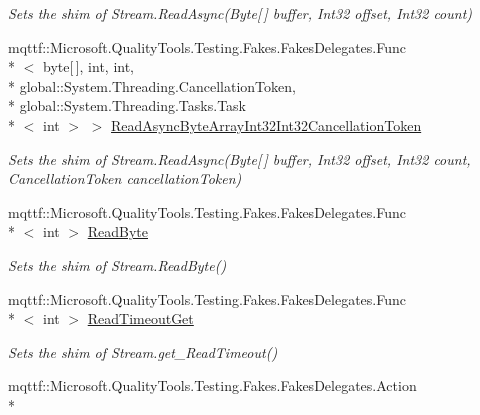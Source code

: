 \begin{DoxyCompactItemize}
\begin{DoxyCompactList}\small\item\em Sets the shim of Stream.\-Read\-Async(\-Byte\mbox{[}$\,$\mbox{]} buffer, Int32 offset, Int32 count)\end{DoxyCompactList}\item 
mqttf\-::\-Microsoft.\-Quality\-Tools.\-Testing.\-Fakes.\-Fakes\-Delegates.\-Func\\*
$<$ byte\mbox{[}$\,$\mbox{]}, int, int, \\*
global\-::\-System.\-Threading.\-Cancellation\-Token, \\*
global\-::\-System.\-Threading.\-Tasks.\-Task\\*
$<$ int $>$ $>$ \hyperlink{class_system_1_1_i_o_1_1_fakes_1_1_shim_stream_a0127b225db91b4b591e8f3e277f572d8}{Read\-Async\-Byte\-Array\-Int32\-Int32\-Cancellation\-Token}
\begin{DoxyCompactList}\small\item\em Sets the shim of Stream.\-Read\-Async(\-Byte\mbox{[}$\,$\mbox{]} buffer, Int32 offset, Int32 count, Cancellation\-Token cancellation\-Token)\end{DoxyCompactList}\item 
mqttf\-::\-Microsoft.\-Quality\-Tools.\-Testing.\-Fakes.\-Fakes\-Delegates.\-Func\\*
$<$ int $>$ \hyperlink{class_system_1_1_i_o_1_1_fakes_1_1_shim_stream_accf0a9f7eb0fc443ffe11f6767d12d09}{Read\-Byte}
\begin{DoxyCompactList}\small\item\em Sets the shim of Stream.\-Read\-Byte()\end{DoxyCompactList}\item 
mqttf\-::\-Microsoft.\-Quality\-Tools.\-Testing.\-Fakes.\-Fakes\-Delegates.\-Func\\*
$<$ int $>$ \hyperlink{class_system_1_1_i_o_1_1_fakes_1_1_shim_stream_a44d622075e1cc45601f5f6b186f8943e}{Read\-Timeout\-Get}
\begin{DoxyCompactList}\small\item\em Sets the shim of Stream.\-get\-\_\-\-Read\-Timeout()\end{DoxyCompactList}\item 
mqttf\-::\-Microsoft.\-Quality\-Tools.\-Testing.\-Fakes.\-Fakes\-Delegates.\-Action\\*

\end{DoxyCompactItemize}
